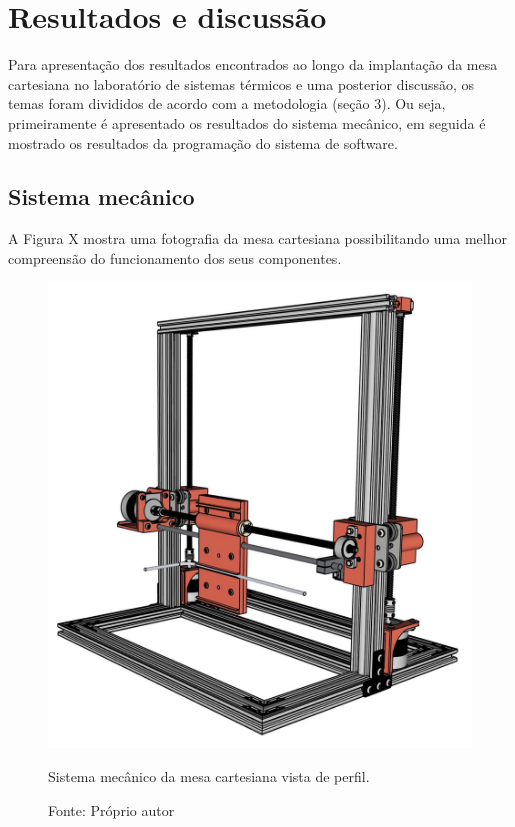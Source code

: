 \chapter{Resultados e discussão}
\label{chap:resultados}

Para apresentação dos resultados encontrados ao longo da implantação da mesa cartesiana no 
laboratório de sistemas térmicos e uma posterior discussão, os temas foram divididos de acordo 
com a metodologia (seção 3). Ou seja, primeiramente é apresentado os resultados do sistema mecânico, 
em seguida é mostrado os resultados da programação do sistema de software.

\section{Sistema mecânico}\label{sec:resmecanico}

A Figura X mostra uma fotografia da mesa cartesiana possibilitando uma melhor compreensão do funcionamento 
dos seus componentes.

\begin{figure}[H]
\centering
\includegraphics[scale = 0.35]{figuras/mesacartesianaperfil}
\caption{Sistema mecânico da mesa cartesiana vista de perfil.}
\caption*{Fonte: Próprio autor}
\label{fig:mesacartesianaperfil}
\end{figure}


